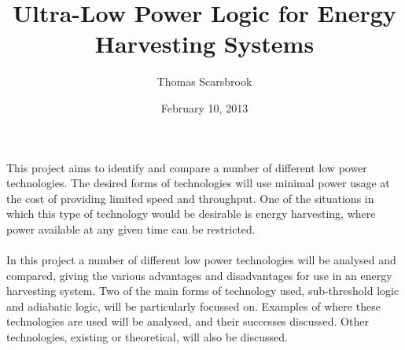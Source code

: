 \documentclass[11pt,a4paper]{article}
\title{Ultra-Low Power Logic for Energy Harvesting Systems}
\author{Thomas Scarsbrook}
\date{February 10, 2013}
\begin{document}
\maketitle

\noindent This project aims to identify and compare a number of different low power technologies.
The desired forms of technologies will use minimal power usage at the cost of providing limited speed and throughput.
One of the situations in which this type of technology would be desirable is energy harvesting, where power available at any given time can be restricted.
\\
\\
\noindent In this project a number of different low power technologies will be analysed and compared, giving the various advantages and disadvantages for use in an energy harvesting system.
Two of the main forms of technology used, sub-threshold logic and adiabatic logic, will be particularly focussed on.
Examples of where these technologies are used will be analysed, and their successes discussed.
Other technologies, existing or theoretical, will also be discussed.
\end{document}
